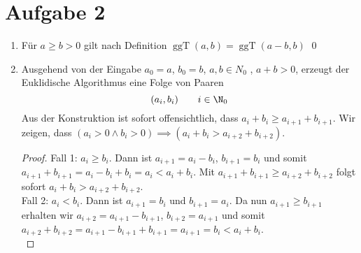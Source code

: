 \documentclass{article}
\begin{document}
\section*{Aufgabe 2}
\begin{enumerate}
	\item Für $a\geq b> 0$ gilt nach Definition $\operatorname{ggT}(a,b) = \operatorname{ggT}(a-b, b)$ \qed
	\item Ausgehend von der Eingabe $a_0 = a$, $b_0 = b$, $a, b \in N_0$ , $a + b > 0$, erzeugt der
	Euklidische Algorithmus eine Folge von Paaren
	\[(a_i, b_i)\qquad i\in \N_0\]
	Aus der Konstruktion ist sofort offensichtlich, dass $a_i + b_i \geq a_{i+1} + b_{i+1}$.
	Wir zeigen, dass $(a_i > 0 \land b_i > 0) \implies (a_i + b_i > a_{i+2} + b_{i+2})$.
	\begin{proof}
		Fall 1: $a_i \geq b_i$. Dann ist $a_{i+1} = a_i-b_i$, $b_{i+1} = b_i$ und somit $a_{i+1} + b_{i+1} = a_i - b_i + b_i = a_i < a_i + b_i$. Mit $a_{i+1} + b_{i+1}\geq a_{i+2} + b_{i+2}$ folgt sofort $a_i + b_i > a_{i+2} + b_{i+2}$.\\
		Fall 2: $a_i < b_i$. Dann ist $a_{i+1} = b_i$ und $b_{i+1} = a_i$. Da nun $a_{i+1} \geq b_{i+1}$ erhalten wir $a_{i+2} = a_{i+1} - b_{i+1}$, $b_{i+2} = a_{i+1}$ und somit $a_{i+2} + b_{i+2} = a_{i+1} - b_{i+1} + b_{i+1} = a_{i+1} = b_i < a_i + b_i$.\\
	\end{proof}
\end{enumerate}
\newpage
\end{document}

